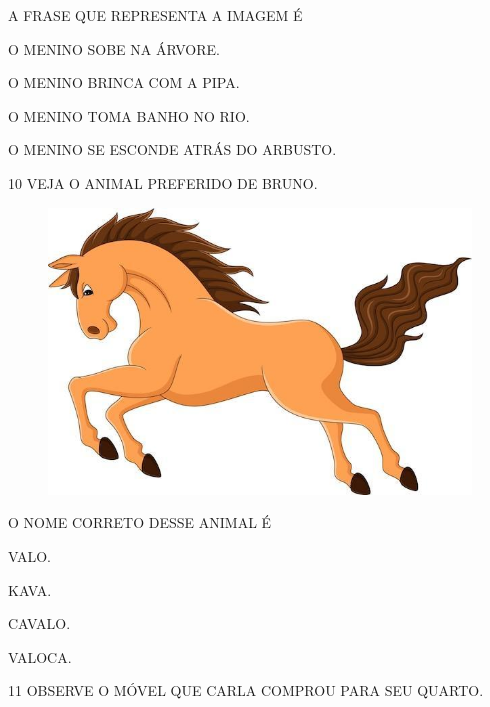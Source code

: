 A FRASE QUE REPRESENTA A IMAGEM É

\begin{escolha}
\item O MENINO SOBE NA ÁRVORE.

\item O MENINO BRINCA COM A PIPA.

\item O MENINO TOMA BANHO NO RIO.

\item O MENINO SE ESCONDE ATRÁS DO ARBUSTO.
\end{escolha}

\pagebreak

\num{10} VEJA O ANIMAL PREFERIDO DE BRUNO.

\begin{figure}[H]
\centering
\includegraphics[width=\textwidth]{media/image234.jpg}
\end{figure}


O NOME CORRETO DESSE ANIMAL É

\begin{multicols}{2}
\begin{escolha}
\item VALO.

\item KAVA.

\item CAVALO.

\item VALOCA.
\end{escolha}
\end{multicols}

\num{11} OBSERVE O MÓVEL QUE CARLA COMPROU PARA SEU QUARTO.

